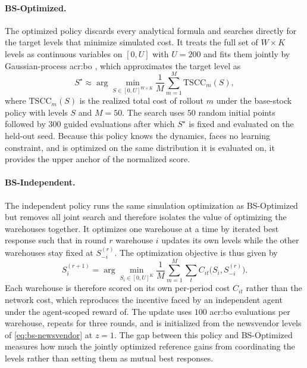 \paragraph{\textbf{BS-Optimized.}} The optimized policy discards every analytical formula and
searches directly for the target levels that minimize simulated cost. It treats the
full set of $W\times K$ levels as continuous variables on $[0,U]$ with $U=200$ and
fits them jointly by Gaussian-process \gls{acr:bo} \citep{Frazier2018}, which approximates the target level as 
\begin{equation}
\label{eq:bs-optimized}
  S^{\star}\approx\arg\min_{S\in[0,U]^{W\times K}}
  \frac{1}{M}\sum_{m=1}^{M}\mathrm{TSCC}_m(S),
\end{equation}
where $\mathrm{TSCC}_m(S)$ is the realized total cost of rollout $m$ under the base-stock
policy with levels $S$ and $M=50$. The search uses $50$ random initial points
followed by $300$ guided evaluations after which $S^{\star}$ is fixed and evaluated
on the held-out seed. Because this policy knows the dynamics, faces no learning
constraint, and is optimized on the same distribution it is evaluated on, it provides the upper anchor of the normalized score.

\paragraph{\textbf{BS-Independent.}} The independent policy runs the same simulation
optimization as BS-Optimized but removes all joint search and therefore isolates the value of
optimizing the warehouses together. It optimizes one warehouse at a time by iterated
best response such that in round $r$ warehouse $i$ updates
its own levels while the other warehouses stay fixed at $S^{(r)}_{-i}$. The optimization objective is thus given by
\begin{equation}
\label{eq:bs-independent}
  S^{(r+1)}_{i}=\arg\min_{S_i\in[0,U]^{K}}
  \frac{1}{M}\sum_{m=1}^{M}\sum_{t}C_{it}\big(S_i,S^{(r)}_{-i}\big).
\end{equation}
Each warehouse is therefore scored on its own per-period cost $C_{it}$ rather than the network cost, which reproduces the incentive faced by an independent agent under the agent-scoped reward of. The update uses $100$ \gls{acr:bo} evaluations per warehouse,
repeats for three rounds, and is initialized from the newsvendor levels of
\autoref{eq:bs-newsvendor} at $z=1$. The gap between this policy and BS-Optimized
measures how much the jointly optimized reference gains from coordinating the levels
rather than setting them as mutual best responses.

